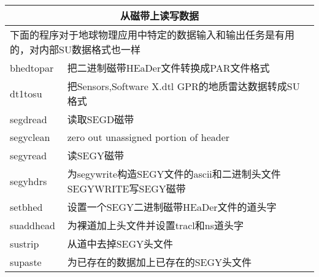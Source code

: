 \begin{tabular}{lp{}}
	\multicolumn{2}{c}{从磁带上读写数据}\\
	\toprule
	\multicolumn{2}{p{0.9\textwidth}}{下面的程序对于地球物理应用中特定的数据输入和输出任务是有用的，对内部SU数据格式也一样}\\
	\midrule
	bhedtopar & 把二进制磁带HEaDer文件转换成PAR文件格式\\
	dt1tosu &  把Sensors,Software X.dtl GPR的地质雷达数据转成SU格式\\
	segdread & 读取SEGD磁带\\
	segyclean & zero out unassigned portion of header\\
	segyread & 读SEGY磁带\\
	segyhdrs & 为segywrite构造SEGY文件的ascii和二进制头文件SEGYWRITE写SEGY磁带\\
	setbhed & 设置一个SEGY二进制磁带HEaDer文件的道头字\\
	suaddhead & 为裸道加上头文件并设置tracl和ns道头字\\
	sustrip & 从道中去掉SEGY头文件\\
	supaste & 为已存在的数据加上已存在的SEGY头文件\\
	\bottomrule	
\end{tabular}\par
\mvspace
